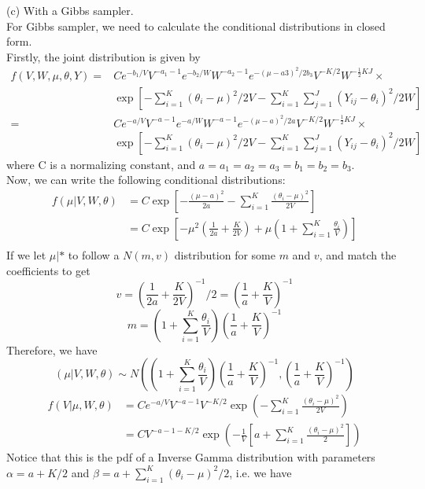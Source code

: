 (c) With a Gibbs sampler.\\
For Gibbs sampler, we need to calculate the conditional distributions in closed form. \\
Firstly, the joint distribution is given by 
\begin{align*}
f(V,W,\mu,\theta,Y) = &Ce^{-b_1/V}V^{-a_1-1}e^{-b_2/W}W^{-a_2-1}e^{-(\mu-a3)^2/2b_3}V^{-K/2}W^{-\frac{1}{2}KJ}\times\\
                      &\exp\left[-\sum\limits_{i=1}^K(\theta_i-\mu)^2/2V - \sum\limits_{i=1}^K\sum\limits_{j=1}^J(Y_{ij}-\theta_i)^2/2W\right]\\
                       = &Ce^{-a/V}V^{-a-1}e^{-a/W}W^{-a-1}e^{-(\mu-a)^2/2a}V^{-K/2}W^{-\frac{1}{2}KJ}\times\\
                      &\exp\left[-\sum\limits_{i=1}^K(\theta_i-\mu)^2/2V - \sum\limits_{i=1}^K\sum\limits_{j=1}^J(Y_{ij}-\theta_i)^2/2W\right]
\end{align*}
where C is a normalizing constant, and $a=a_1=a_2=a_3=b_1=b_2=b_3$. \\
Now, we can write the following conditional distributions:
\begin{align*}
f(\mu|V,W,\theta) &= C\exp\left[-\frac{(\mu-a)^2}{2a}-\sum\limits_{i=1}^K\frac{(\theta_i-\mu)^2}{2V}\right]\\
    &= C\exp\left[-\mu^2\left(\frac{1}{2a}+\frac{K}{2V}\right)+\mu\left(1+\sum\limits_{i=1}^K\frac{\theta_i}{V}\right)\right]\\
\end{align*}
If we let $\mu|*$ to follow a $N(m,v)$ distribution for some $m$ and $v$, and match the coefficients to get
$$v=\left(\frac{1}{2a}+\frac{K}{2V}\right)^{-1}\bigg/2 = \left(\frac{1}{a}+\frac{K}{V}\right)^{-1}$$
$$m=\left(1+\sum\limits_{i=1}^K\frac{\theta_i}{V}\right)\left(\frac{1}{a}+\frac{K}{V}\right)^{-1}$$
Therefore, we have 
$$(\mu|V,W,\theta)\sim N\left(\left(1+\sum\limits_{i=1}^K\frac{\theta_i}{V}\right)\left(\frac{1}{a}+\frac{K}{V}\right)^{-1},\left(\frac{1}{a}+\frac{K}{V}\right)^{-1}\right)$$
\begin{align*}
f(V|\mu,W,\theta) &= Ce^{-a/V}V^{-a-1}V^{-K/2}\exp\left(-\sum\limits_{i=1}^K\frac{(\theta_i-\mu)^2}{2V}\right)\\
  &=CV^{-a-1-K/2}\exp\left(-\frac{1}{V}\left[a+\sum\limits_{i=1}^K\frac{(\theta_i-\mu)^2}{2}\right]\right)
\end{align*}
Notice that this is the pdf of a Inverse Gamma distribution with parameters $\alpha = a + K/2$ and $\beta = a+\sum_{i=1}^K(\theta_i-\mu)^2/2$, i.e. we have 
